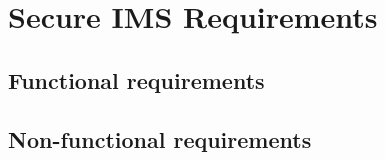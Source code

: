 \chapter{Secure IMS Requirements}\label{ch:build-secure-ims}


\section{Functional requirements}\label{sec:functional-requirements}


\section{Non-functional requirements}\label{sec:non-functional-requirements}